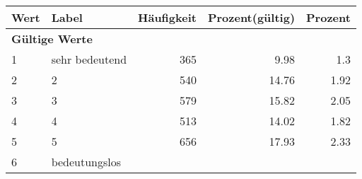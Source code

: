      \begin{longtable}{lXrrr}
     \toprule
     \textbf{Wert} & \textbf{Label} & \textbf{Häufigkeit} & \textbf{Prozent(gültig)} & \textbf{Prozent} \\
     \endhead
     \midrule
     \multicolumn{5}{l}{\textbf{Gültige Werte}}\\

     1 &
     \multicolumn{1}{X}{ sehr bedeutend   } &


       \num{365} &
       \num[round-mode=places,round-precision=2]{9.98} &
         \num[round-mode=places,round-precision=2]{1.3} \\

     2 &
     \multicolumn{1}{X}{ 2   } &


       \num{540} &
       \num[round-mode=places,round-precision=2]{14.76} &
         \num[round-mode=places,round-precision=2]{1.92} \\

     3 &
     \multicolumn{1}{X}{ 3   } &


       \num{579} &
       \num[round-mode=places,round-precision=2]{15.82} &
         \num[round-mode=places,round-precision=2]{2.05} \\

     4 &
     \multicolumn{1}{X}{ 4   } &


       \num{513} &
       \num[round-mode=places,round-precision=2]{14.02} &
         \num[round-mode=places,round-precision=2]{1.82} \\

     5 &
     \multicolumn{1}{X}{ 5   } &


       \num{656} &
       \num[round-mode=places,round-precision=2]{17.93} &
         \num[round-mode=places,round-precision=2]{2.33} \\

     6 &
     \multicolumn{1}{X}{ bedeutungslos   } &



\end{longtable}
